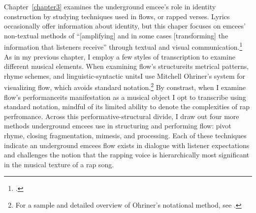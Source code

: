 Chapter~\ref{chapter3} examines the underground emcee's role in identity construction by studying 
techniques used in flows, or rapped verses. Lyrics occasionally offer information about identity,
but this chaper focuses on emcees' non-textual methods of ``[amplifying] and in some cases [transforming]
the information that listeners receive'' through textual and visual communication.\footnote{
    \autocite[12]{lorenkajikawaSoundingRaceRap2015}.} 
As in my previous chapter, I employ a few styles of transcription to examine different musical
elements. When examining flow's structure\textemdash its metrical patterns, rhyme schemes, and 
linguistic-syntactic units\textemdash I use Mitchell Ohriner's system for visualizing flow, which
avoids standard notation.\footnote{
    For a sample and detailed overview of Ohriner's notational method, see 
    \autocite[xxvii--xl]{mitchellohrinerFlowRhythmicVoice2019}.}
By constrast, when I examine flow's performance\textemdash its manifestation as a musical object\textemdash
I opt to transcribe using standard notation, mindful of its limited ability to denote the complexities
of rap perfromance. Across this performative-structural divide, I draw out four more methods underground
emcees use in structuring and performing flow: pivot rhyme, closing fragmentation, mimesis, and processing.
Each of these techniques indicate an underground emcees flow exists in dialogue with listener expectations 
and challenges the notion that the rapping voice is hierarchically most significant in the musical texture
of a rap song.